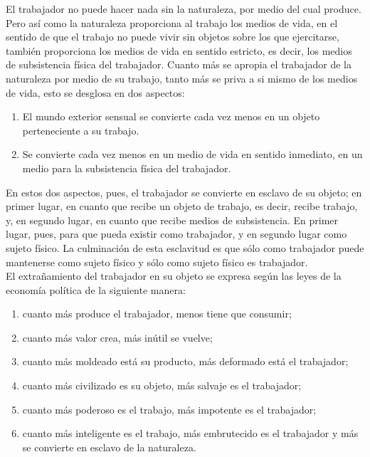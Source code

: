 El trabajador no puede hacer nada sin la naturaleza, por medio del cual produce. Pero así como la naturaleza proporciona al trabajo los medios de vida, en el sentido de que el trabajo no puede vivir sin objetos sobre los que ejercitarse, también proporciona los medios de vida en sentido estricto, es decir, los medios de subsistencia física del trabajador. Cuanto más se apropia el trabajador de la naturaleza por medio de su trabajo, tanto más se priva a si mismo de los medios de vida, esto se desglosa en dos aspectos:
\begin{enumerate}[1.]
    \item  El mundo exterior sensual se convierte cada vez menos en un objeto perteneciente a su trabajo.
    \item Se convierte cada vez menos en un medio de vida en sentido inmediato, en un medio para la subsistencia física del trabajador.
\end{enumerate}

En estos dos aspectos, pues, el trabajador se convierte en esclavo de su objeto; en primer lugar, en cuanto que recibe un objeto de trabajo, es decir, recibe trabajo, y, en segundo lugar, en cuanto que recibe medios de subsistencia. En primer lugar, pues, para que pueda existir como trabajador, y en segundo lugar como sujeto físico. La culminación de esta esclavitud es que sólo como trabajador puede mantenerse como sujeto físico y sólo como sujeto físico es trabajador.\\

El extrañamiento del trabajador en su objeto se expresa según las leyes de la economía política de la siguiente manera:

\begin{enumerate}[1.]
    \item cuanto más produce el trabajador, menos tiene que consumir;
    \item cuanto más valor crea, más inútil se vuelve;
    \item cuanto más moldeado está su producto, más deformado está el trabajador;
    \item cuanto más civilizado es su objeto, más salvaje es el trabajador;
    \item cuanto más poderoso es el trabajo, más impotente es el trabajador;
    \item cuanto más inteligente es el trabajo, más embrutecido es el trabajador y más se convierte en esclavo de la naturaleza.
\end{enumerate}

